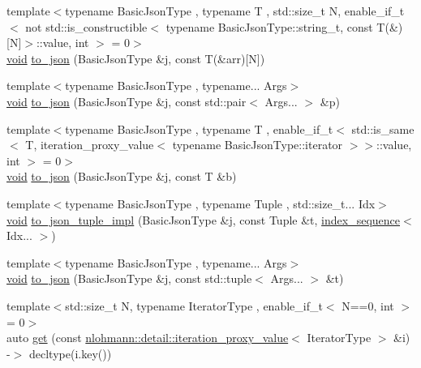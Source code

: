 \begin{DoxyCompactItemize}
\item 
{\footnotesize template$<$typename Basic\+Json\+Type , typename T , std\+::size\+\_\+t N, enable\+\_\+if\+\_\+t$<$ not std\+::is\+\_\+constructible$<$ typename Basic\+Json\+Type\+::string\+\_\+t, const T(\&)\mbox{[}\+N\mbox{]}$>$\+::value, int $>$  = 0$>$ }\\\hyperlink{namespacenlohmann_1_1detail_a59fca69799f6b9e366710cb9043aa77d}{void} \hyperlink{namespacenlohmann_1_1detail_a20ea5175c8999fc8b673e46b892f71f6}{to\+\_\+json} (Basic\+Json\+Type \&j, const T(\&arr)\mbox{[}N\mbox{]})
\item 
{\footnotesize template$<$typename Basic\+Json\+Type , typename... Args$>$ }\\\hyperlink{namespacenlohmann_1_1detail_a59fca69799f6b9e366710cb9043aa77d}{void} \hyperlink{namespacenlohmann_1_1detail_aa30611f74062379d3420c40487cf3bb3}{to\+\_\+json} (Basic\+Json\+Type \&j, const std\+::pair$<$ Args... $>$ \&p)
\item 
{\footnotesize template$<$typename Basic\+Json\+Type , typename T , enable\+\_\+if\+\_\+t$<$ std\+::is\+\_\+same$<$ T, iteration\+\_\+proxy\+\_\+value$<$ typename Basic\+Json\+Type\+::iterator $>$$>$\+::value, int $>$  = 0$>$ }\\\hyperlink{namespacenlohmann_1_1detail_a59fca69799f6b9e366710cb9043aa77d}{void} \hyperlink{namespacenlohmann_1_1detail_aaa77b0c9745130b77733a92a1a2e82ec}{to\+\_\+json} (Basic\+Json\+Type \&j, const T \&b)
\item 
{\footnotesize template$<$typename Basic\+Json\+Type , typename Tuple , std\+::size\+\_\+t... Idx$>$ }\\\hyperlink{namespacenlohmann_1_1detail_a59fca69799f6b9e366710cb9043aa77d}{void} \hyperlink{namespacenlohmann_1_1detail_a510dfa15b01e9a8afe31600a27b28199}{to\+\_\+json\+\_\+tuple\+\_\+impl} (Basic\+Json\+Type \&j, const Tuple \&t, \hyperlink{structnlohmann_1_1detail_1_1index__sequence}{index\+\_\+sequence}$<$ Idx... $>$)
\item 
{\footnotesize template$<$typename Basic\+Json\+Type , typename... Args$>$ }\\\hyperlink{namespacenlohmann_1_1detail_a59fca69799f6b9e366710cb9043aa77d}{void} \hyperlink{namespacenlohmann_1_1detail_aa7a47b08eee864c2c108c04954919648}{to\+\_\+json} (Basic\+Json\+Type \&j, const std\+::tuple$<$ Args... $>$ \&t)
\item 
{\footnotesize template$<$std\+::size\+\_\+t N, typename Iterator\+Type , enable\+\_\+if\+\_\+t$<$ N==0, int $>$  = 0$>$ }\\auto \hyperlink{namespacenlohmann_1_1detail_acc422c11342b31368f610b6f96fcedc6}{get} (const \hyperlink{classnlohmann_1_1detail_1_1iteration__proxy__value}{nlohmann\+::detail\+::iteration\+\_\+proxy\+\_\+value}$<$ Iterator\+Type $>$ \&i) -\/$>$ decltype(i.\+key())

\end{DoxyCompactItemize}
